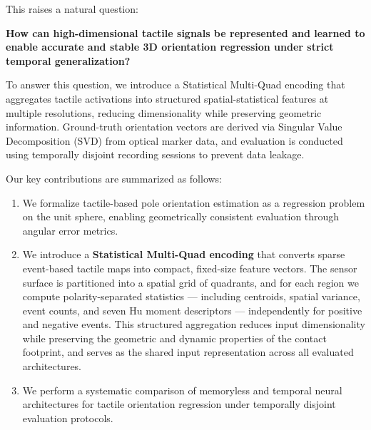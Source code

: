 \documentclass{article}
\begin{document}
    This raises a natural question:
    
    \textbf{How can high-dimensional tactile signals be represented and learned to enable accurate and stable 3D orientation regression under strict temporal generalization?}
    
    To answer this question, we introduce a Statistical Multi-Quad encoding that aggregates tactile activations into structured spatial-statistical features at multiple resolutions, reducing dimensionality while preserving geometric information. Ground-truth orientation vectors are derived via Singular Value Decomposition (SVD) from optical marker data, and evaluation is conducted using temporally disjoint recording sessions to prevent data leakage.
    
    Our key contributions are summarized as follows:

    \begin{enumerate}
        \item We formalize tactile-based pole orientation estimation as a regression problem on the unit sphere, enabling geometrically consistent evaluation through angular error metrics.
        

        \item We introduce a \textbf{Statistical Multi-Quad encoding} that converts sparse event-based tactile maps into compact, fixed-size feature vectors. The sensor surface is partitioned into a spatial grid of quadrants, and for each region we compute polarity-separated statistics — including centroids, spatial variance, event counts, and seven Hu moment descriptors — independently for positive and negative events. This structured aggregation reduces input dimensionality while preserving the geometric and dynamic properties of the contact footprint, and serves as the shared input representation across all evaluated architectures.
        
        
        \item We perform a systematic comparison of memoryless and temporal neural architectures for tactile orientation regression under temporally disjoint evaluation protocols.
    \end{enumerate}
\end{document}
